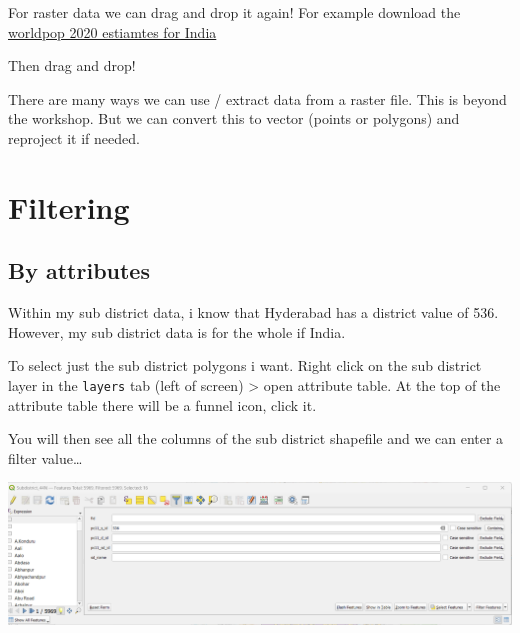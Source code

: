 \documentclass[
  letterpaper,
]{scrbook}
\begin{document}
For raster data we can drag and drop it again! For example download the
\href{https://hub.worldpop.org/geodata/summary?id=49804}{worldpop 2020
estiamtes for India}

Then drag and drop!

\begin{tcolorbox}[enhanced jigsaw, toprule=.15mm, colframe=quarto-callout-tip-color-frame, coltitle=black, left=2mm, rightrule=.15mm, breakable, bottomrule=.15mm, opacityback=0, bottomtitle=1mm, title=\textcolor{quarto-callout-tip-color}{\faLightbulb}\hspace{0.5em}{Tip}, colbacktitle=quarto-callout-tip-color!10!white, titlerule=0mm, colback=white, toptitle=1mm, arc=.35mm, leftrule=.75mm, opacitybacktitle=0.6]

There are many ways we can use / extract data from a raster file. This
is beyond the workshop. But we can convert this to vector (points or
polygons) and reproject it if needed.

\end{tcolorbox}

\hypertarget{filtering}{%
\section{Filtering}\label{filtering}}

\hypertarget{by-attributes}{%
\subsection{By attributes}\label{by-attributes}}

Within my sub district data, i know that Hyderabad has a district value
of 536. However, my sub district data is for the whole if India.

To select just the sub district polygons i want. Right click on the sub
district layer in the \texttt{layers} tab (left of screen)
\textgreater{} open attribute table. At the top of the attribute table
there will be a funnel icon, click it.

You will then see all the columns of the sub district shapefile and we
can enter a filter value\ldots{}

\includegraphics{general_images/filter.png}
\end{document}
